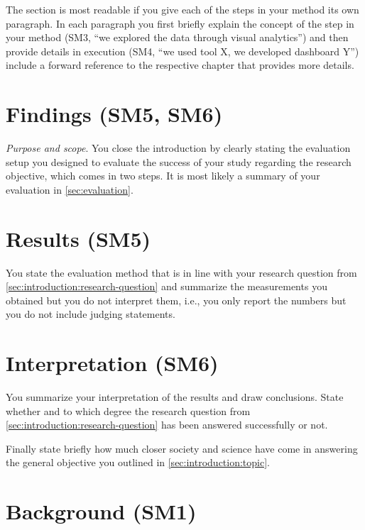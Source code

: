 \documentclass[
  numbers=autoendperiod,
  ngerman,  %
  a4paper,  %
  twoside,  %
  bibliography=totoc,
  headsepline,
  cleardoublepage=empty,
  parskip=half,
  draft=false
]{scrbook}
\theoremstyle{break}
\begin{document}
The section is most readable if you give each of the steps in your method its own paragraph.
In each paragraph you first briefly explain the concept of the step in your method (SM3, ``we explored the data through visual analytics'') and then provide details in execution (SM4, ``we used tool X, we developed dashboard Y'') include a forward reference to the respective chapter that provides more details.

\section{Findings (SM5, SM6)}\label{sec:introduction:results}

\emph{Purpose and scope}.
You close the introduction by clearly stating the evaluation setup you designed to evaluate the success of your study regarding the research objective, which comes in two steps.
It is most likely a summary of your evaluation in \cref{sec:evaluation}.

\section*{Results (SM5)}

You state the evaluation method that is in line with your research question from \cref{sec:introduction:research-question} and summarize the measurements you obtained but you do not interpret them, i.e., you only report the numbers but you do not include judging statements.

\section*{Interpretation (SM6)}

You summarize your interpretation of the results and draw conclusions.
State whether and to which degree the research question from \cref{sec:introduction:research-question} has been answered successfully or not.

Finally state briefly how much closer society and science have come in answering the general objective you outlined in \cref{sec:introduction:topic}.

\section{Background (SM1)}\label{sec:background}
\end{document}
